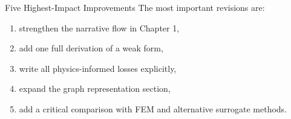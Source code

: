 \documentclass[aspectratio=169]{beamer}
\begin{document}
\begin{frame}{Five Highest-Impact Improvements}
The most important revisions are:
\begin{enumerate}
    \item strengthen the narrative flow in Chapter 1,
    \item add one full derivation of a weak form,
    \item write all physics-informed losses explicitly,
    \item expand the graph representation section,
    \item add a critical comparison with FEM and alternative surrogate methods.
\end{enumerate}
\end{frame}
\end{document}
